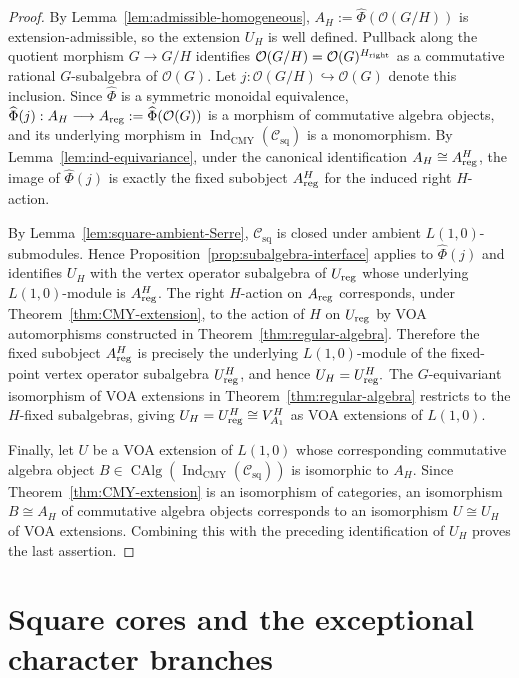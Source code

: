 \documentclass[12pt,leqno]{amsart}
\numberwithin{equation}{section} \newtheorem{thm}{Theorem}[section] \newtheorem{lem}[thm]{Lemma} \newtheorem{ex}[thm]{Example} \newtheorem{prop}[thm]{Proposition} \newtheorem{cor}[thm]{Corollary} \newtheorem{defi}[thm]{Definition} \newtheorem{rmk}[thm]{Remark} \newtheorem{notation}[thm]{Notation}
\newcommand{\OO}{\mathcal O}
\newcommand{\Csq}{\mathcal C_{\mathrm{sq}}}
\newcommand{\CAlg}{\operatorname{CAlg}}
\newcommand{\IndCMY}{\operatorname{Ind}_{\mathrm{CMY}}}
\begin{document}
\begin{proof}
By Lemma~\ref{lem:admissible-homogeneous}, \(A_H:=\widehat\Phi(\OO(G/H))\) is extension-admissible, so the extension $U_H$ is well defined. Pullback along the quotient morphism $G\to G/H$ identifies \(\OO(G/H)=\OO(G)^{H_{\rm right}}\) as a commutative rational $G$-subalgebra of $\OO(G)$. Let \(j:\OO(G/H)\hookrightarrow\OO(G)\) denote this inclusion. Since $\widehat\Phi$ is a symmetric monoidal equivalence, \(\widehat\Phi(j):A_H\longrightarrow A_{\rm reg}:=\widehat\Phi(\OO(G))\) is a morphism of commutative algebra objects, and its underlying morphism in $\IndCMY(\Csq)$ is a monomorphism. By Lemma~\ref{lem:ind-equivariance}, under the canonical identification \(A_H\cong A_{\rm reg}^{H}\), the image of $\widehat\Phi(j)$ is exactly the fixed subobject $A_{\rm reg}^{H}$ for the induced right $H$-action.

By Lemma~\ref{lem:square-ambient-Serre}, $\Csq$ is closed under ambient $L(1,0)$-submodules. Hence Proposition~\ref{prop:subalgebra-interface} applies to $\widehat\Phi(j)$ and identifies $U_H$ with the vertex operator subalgebra of $U_{\rm reg}$ whose underlying $L(1,0)$-module is $A_{\rm reg}^{H}$. The right $H$-action on $A_{\rm reg}$ corresponds, under Theorem~\ref{thm:CMY-extension}, to the action of $H$ on $U_{\rm reg}$ by VOA automorphisms constructed in Theorem~\ref{thm:regular-algebra}. Therefore the fixed subobject $A_{\rm reg}^{H}$ is precisely the underlying $L(1,0)$-module of the fixed-point vertex operator subalgebra $U_{\rm reg}^{H}$, and hence \(U_H=U_{\rm reg}^{H}.\) The $G$-equivariant isomorphism of VOA extensions in Theorem~\ref{thm:regular-algebra} restricts to the $H$-fixed subalgebras, giving \(U_H=U_{\rm reg}^{H}\cong V_{A_1}^{H}\) as VOA extensions of $L(1,0)$.

Finally, let $U$ be a VOA extension of $L(1,0)$ whose corresponding commutative algebra object $B\in\CAlg(\IndCMY(\Csq))$ is isomorphic to $A_H$. Since Theorem~\ref{thm:CMY-extension} is an isomorphism of categories, an isomorphism $B\cong A_H$ of commutative algebra objects corresponds to an isomorphism $U\cong U_H$ of VOA extensions. Combining this with the preceding identification of $U_H$ proves the last assertion.
\end{proof}

\section{Square cores and the exceptional character branches}\label{sec:squarecore}
\end{document}

